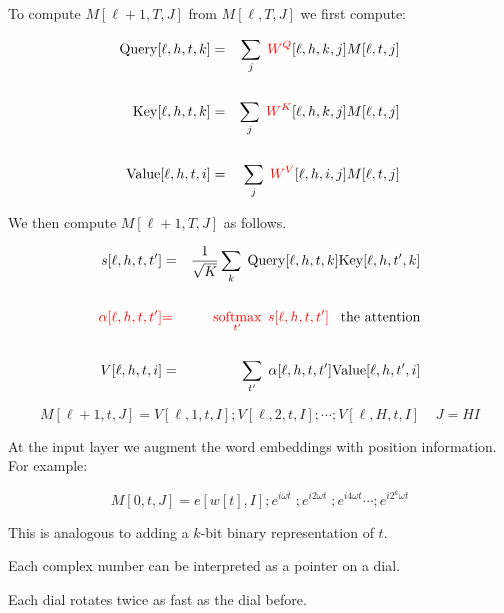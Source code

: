 {

To compute {\color{red} $M[\ell+1,T,J]$} from {\color{red} $M[\ell,T,J]$} we first compute:
      
\begin{eqnarray*}
\mathrm{Query}[\ell,h,t,k] & = & \sum_j\;{\color{red} W^Q}[\ell,h,k,j]M[\ell,t,j] \\
\\
\mathrm{Key}[\ell,h,t,k] & = & \sum_j\;{\color{red} W^K}[\ell,h,k,j]M[\ell,t,j] \\
\\
\mathrm{Value}[\ell,h,t,i] & = & \sum_j\;{\color{red} W^V}[\ell,h,i,j]M[\ell,t,j]
\end{eqnarray*}


We then compute {\color{red} $M[\ell+1,T,J]$} as follows.

{\color{red}
\begin{eqnarray*}
s[\ell,h,t,t'] & = &\frac{1}{\sqrt{K}} \sum_k\;\mathrm{Query}[\ell,h,t,k]\mathrm{Key}[\ell,h,t',k] \\
\\
{\color{red} \alpha[\ell,h,t,t']} & {\color{red} =} & {\color{red} \operatorname*{softmax}_{t'} \;s[\ell,h,t,t']}\;\;\;\mbox{the attention} \\
\\
V[\ell,h,t,i] & = & \sum_{t'}\;\alpha[\ell,h,t,t']\mathrm{Value}[\ell,h,t',i]
\end{eqnarray*}
}

{\color{red} $$M[\ell+1,t,J] = V[\ell,1,t,I];V[\ell,2,t,I];\cdots;V[\ell,H,t,I] \;\;\;\; J = HI$$}


At the input layer we augment the word embeddings with position information. For example:

\vfill
{\color{red} $$M[0,t,J] = e[w[t],I];e^{i\omega t}\;;e^{i2\omega t}\;;e^{i4\omega t}\cdots;e^{i2^k\omega t}$$}

\vfill
This is analogous to adding a $k$-bit binary representation of $t$.

\vfill
Each complex number can be interpreted as a pointer on a dial.

\vfill
Each dial rotates twice as fast as the dial before.


}
